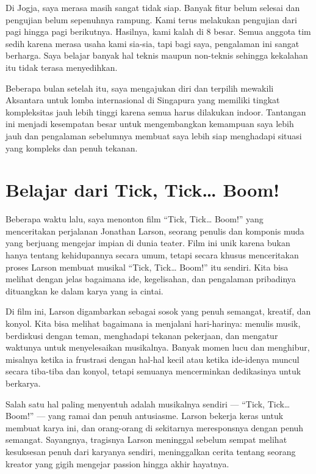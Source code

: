 \documentclass[
  letterpaper,
  DIV=11,
  numbers=noendperiod]{scrreprt}
\begin{document}
Di Jogja, saya merasa masih sangat tidak siap. Banyak fitur belum
selesai dan pengujian belum sepenuhnya rampung. Kami terus melakukan
pengujian dari pagi hingga pagi berikutnya. Hasilnya, kami kalah di 8
besar. Semua anggota tim sedih karena merasa usaha kami sia-sia, tapi
bagi saya, pengalaman ini sangat berharga. Saya belajar banyak hal
teknis maupun non-teknis sehingga kekalahan itu tidak terasa
menyedihkan.

Beberapa bulan setelah itu, saya mengajukan diri dan terpilih mewakili
Aksantara untuk lomba internasional di Singapura yang memiliki tingkat
kompleksitas jauh lebih tinggi karena semua harus dilakukan indoor.
Tantangan ini menjadi kesempatan besar untuk mengembangkan kemampuan
saya lebih jauh dan pengalaman sebelumnya membuat saya lebih siap
menghadapi situasi yang kompleks dan penuh tekanan.

\section{Belajar dari Tick, Tick\ldots{}
Boom!}\label{belajar-dari-tick-tick-boom}

Beberapa waktu lalu, saya menonton film ``Tick, Tick\ldots{} Boom!''
yang menceritakan perjalanan Jonathan Larson, seorang penulis dan
komponis muda yang berjuang mengejar impian di dunia teater. Film ini
unik karena bukan hanya tentang kehidupannya secara umum, tetapi secara
khusus menceritakan proses Larson membuat musikal ``Tick, Tick\ldots{}
Boom!'' itu sendiri. Kita bisa melihat dengan jelas bagaimana ide,
kegelisahan, dan pengalaman pribadinya dituangkan ke dalam karya yang ia
cintai.

Di film ini, Larson digambarkan sebagai sosok yang penuh semangat,
kreatif, dan konyol. Kita bisa melihat bagaimana ia menjalani
hari-harinya: menulis musik, berdiskusi dengan teman, menghadapi tekanan
pekerjaan, dan mengatur waktunya untuk menyelesaikan musikalnya. Banyak
momen lucu dan menghibur, misalnya ketika ia frustrasi dengan hal-hal
kecil atau ketika ide-idenya muncul secara tiba-tiba dan konyol, tetapi
semuanya mencerminkan dedikasinya untuk berkarya.

Salah satu hal paling menyentuh adalah musikalnya sendiri --- ``Tick,
Tick\ldots{} Boom!'' --- yang ramai dan penuh antusiasme. Larson bekerja
keras untuk membuat karya ini, dan orang-orang di sekitarnya
meresponsnya dengan penuh semangat. Sayangnya, tragisnya Larson
meninggal sebelum sempat melihat kesuksesan penuh dari karyanya sendiri,
meninggalkan cerita tentang seorang kreator yang gigih mengejar passion
hingga akhir hayatnya.
\end{document}
